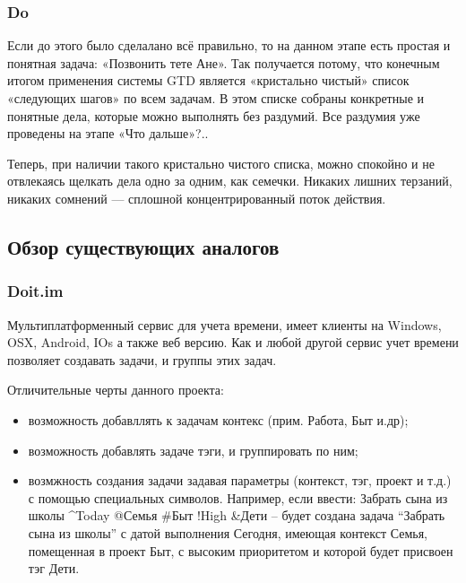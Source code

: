 \subsubsection{Do }

Если до этого было сделалано всё правильно, то на данном этапе есть простая и понятная задача: «Позвонить тете Ане».
Так получается потому, что конечным итогом применения системы GTD является «кристально чистый» список «следующих шагов» по всем задачам. В этом списке собраны конкретные и понятные дела, которые можно выполнять без раздумий. Все раздумия уже проведены на этапе «Что дальше»?..

Теперь, при наличии такого кристально чистого списка, можно спокойно и не отвлекаясь щелкать дела одно за одним, как семечки. Никаких лишних терзаний, никаких сомнений — сплошной концентрированный поток действия. 


\subsection{Обзор существующих аналогов } 
\label{sec:practice:analogs}

\subsubsection{Doit.im }
\label{sub:practice:analogs:doit}
Мультиплатформенный  сервис для учета времени, имеет клиенты на Windows, OSX, Android, IOs а также веб версию. Как и любой другой сервис учет времени позволяет создавать задачи, и группы этих задач.

Отличительные черты данного проекта:

\begin{itemize}
  \item возможность добавллять к задачам контекс (прим. Работа, Быт и.др);
  \item возможность добавлять задаче тэги, и группировать по ним;
  \item возмжность создания задачи задавая параметры (контекст, тэг, проект и т.д.) с помощью специальных символов. Например, если ввести: Забрать сына из школы \string^Today @Семья \#Быт !High \&Дети –  будет создана задача “Забрать сына из школы” с датой выполнения Сегодня, имеющая контекст Семья, помещенная в проект Быт, с высоким приоритетом и которой будет присвоен тэг Дети.
\end{itemize}

